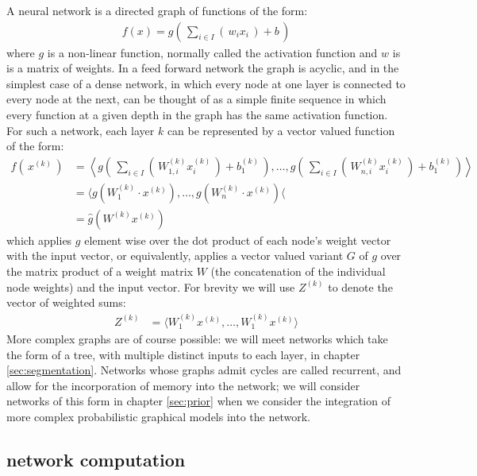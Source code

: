 \documentclass[msc]{infthesis}
\newcommand{\weightedsum}[2][]{Z_{#1}^{(#2)}}
\newcommand{\weights}[2][]{W_{#1}^{(#2)}}
\newcommand{\activation}[2][]{x_{#1}^{(#2)}}
\newcommand{\bias}[2][]{b_{#1}^{(#2)}}
\newcommand{\of}[1]{\left(\,{#1}\,\right)}
\begin{document}
A neural network is a directed graph of functions of the form:
%
\begin{align}
%
f( x ) = g\of{ \sum_{i \in I}\of{ w_{i} x_i } + b}
%
\end{align}
%
where \(g\) is a non-linear function, normally called the activation function and \(w\) is 
is a matrix of weights.
%
In a feed forward network the graph is acyclic, and in the simplest case of a dense network, in
which every node at one layer is connected to every node at the next, can be thought of as a
simple finite sequence in which every function at a given depth in the graph has the same
activation function.
%
For such a network, each layer \(k\) can be represented by a vector valued function of the form:
%
\begin{align}
f\of{ \activation{k} }
  &=
    \left\langle
    g\of{ \sum_{i \in I}\of{ \weights[1,i]{k} \activation[i]{k} } + \bias[1]{k} },
    \ldots,
    g\of{ \sum_{i \in I}\of{ \weights[n,i]{k} \activation[i]{k} } + \bias[1]{k} }
    \right\rangle
    \\
  &= \langle g( \weights[1]{k} \cdot \activation{k} ), \ldots, g( \weights[n]{k} \cdot \activation{k} ) \langle
  \\
  &= \hat{g}( \weights{k} \activation{k} )
\end{align}
%
which applies \(g\) element wise over the dot product of each node's weight vector with 
the input vector, or equivalently, applies a vector valued variant \(G\) of \(g\) over
the matrix product of a weight matrix \(W\) (the concatenation of the individual node 
weights) and the input vector.  For brevity we will use \(\weightedsum{k}\) to denote
the vector of weighted sums:
\begin{align}
  \weightedsum{k}
  &=
  \langle\weights[1]{k}\activation{k}, \ldots, \weights[1]{k}\activation{k}\rangle
\end{align}
% 
More complex graphs are of course possible: we will meet networks which take the form of a tree,
with multiple distinct inputs to each layer, in chapter \ref{sec:segmentation}.  Networks whose
graphs admit cycles are called recurrent, and allow for the incorporation of memory into the
network; we will consider networks of this form in chapter \ref{sec:prior} when we consider
the integration of more complex probabilistic graphical models into the network.




\subsection{network computation}
\label{sec:classification:feed-forward:computation}
\end{document}
